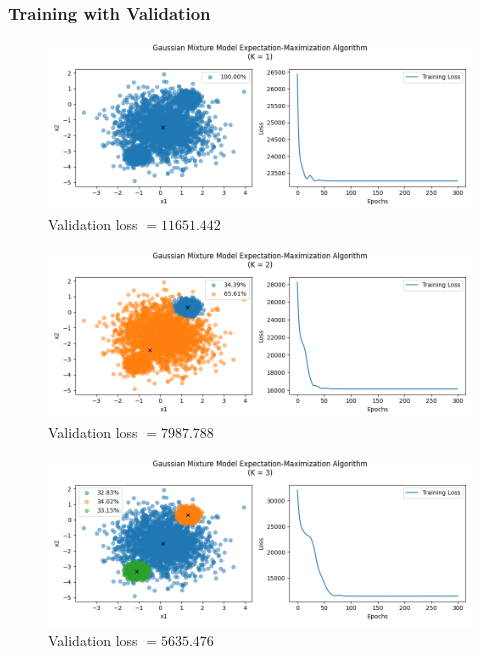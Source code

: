 \documentclass[letterpaper]{article}
\begin{document}
\subsubsection{Training with Validation}

\begin{figure}[H]
	\centering
	\includegraphics[width=\linewidth]{Figure_8}
	\caption{Validation loss $ = 11651.442$}
	\label{fig:plot8}
\end{figure}

\begin{figure}[H]
	\centering
	\includegraphics[width=\linewidth]{Figure_9}
	\caption{Validation loss $ = 7987.788$}
	\label{fig:plot9}
\end{figure}

\begin{figure}[H]
	\centering
	\includegraphics[width=\linewidth]{Figure_10}
	\caption{Validation loss $ = 5635.476$}
	\label{fig:plot10}
\end{figure}
\end{document}
